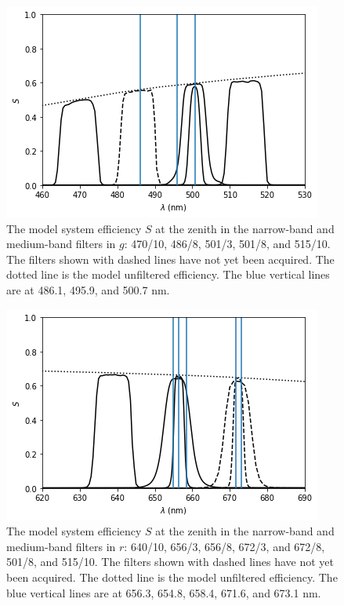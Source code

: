 \begin{figure}
\begin{center}
\includegraphics[width=0.7\linewidth]{figures/huitzi-f20-S-NBMB-g.png}
\medskip
\caption{The model system efficiency $S$ at the zenith in the narrow-band and medium-band filters in $g$: 470/10, 486/8, 501/3, 501/8, and 515/10. The filters shown with dashed lines have not yet been acquired. The dotted line is the model unfiltered efficiency. The blue vertical lines are at 486.1, 495.9, and 500.7 nm.}
\end{center}
\end{figure}

\begin{figure}
\begin{center}
\includegraphics[width=0.7\linewidth]{figures/huitzi-f20-S-NBMB-r.png}
\medskip
\caption{The model system efficiency $S$ at the zenith in the narrow-band and medium-band filters in $r$: 640/10, 656/3, 656/8, 672/3, and 672/8, 501/8, and 515/10. The filters shown with dashed lines have not yet been acquired. The dotted line is the model unfiltered efficiency. The blue vertical lines are at 656.3, 654.8, 658.4, 671.6, and 673.1 nm.}
\end{center}
\end{figure}

